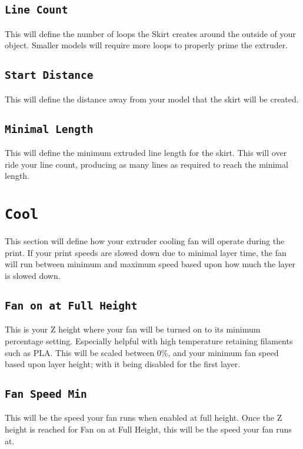 \subsection{\texttt{Line Count}}
This will define the number of loops the Skirt creates around the outside of your object. Smaller models will require more loops to properly prime the extruder.

\subsection{\texttt{Start Distance}}
This will define the distance away from your model that the skirt will be created. 

\subsection{\texttt{Minimal Length}}
This will define the minimum extruded line length for the skirt. This will over ride your line count, producing as many lines as required to reach the minimal length.

\section{\texttt{Cool}}
This section will define how your extruder cooling fan will operate during the print. If your print speeds are slowed down due to minimal layer time, the fan will run between minimum and maximum speed based upon how much the layer is slowed down.

\subsection{\texttt{Fan on at Full Height}}
This is your Z height where your fan will be turned on to its minimum percentage setting. Especially helpful with high temperature retaining filaments such as PLA. This will be scaled between 0\%, and your minimum fan speed based upon layer height; with it being disabled for the first layer.

\subsection{\texttt{Fan Speed Min}}

This will be the speed your fan runs when enabled at full height. Once the Z height is reached for Fan on at Full Height, this will be the speed your fan runs at.

